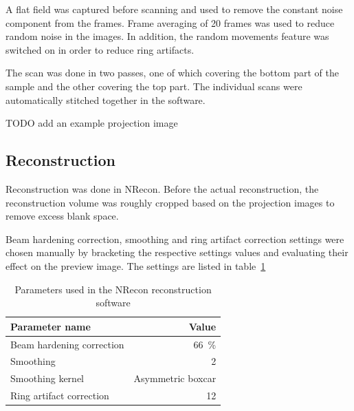 \documentclass[a4paper,twoside,12pt]{article}
\begin{document}
A flat field was captured before scanning and used to remove the constant noise component from the frames. Frame averaging of 20 frames was used to reduce random noise in the images. In addition, the random movements feature was switched on in order to reduce ring artifacts.

The scan was done in two passes, one of which covering the bottom part of the sample and the other covering the top part. The individual scans were automatically stitched together in the software.

TODO add an example projection image

\subsection{Reconstruction}
Reconstruction was done in NRecon. Before the actual reconstruction, the reconstruction volume was roughly cropped based on the projection images to remove excess blank space.

Beam hardening correction, smoothing and ring artifact correction settings were chosen manually by bracketing the respective settings values and evaluating their effect on the preview image. The settings are listed in table~\ref{table:nrecon_settings}
\begin{table}
    \centering
    \caption{Parameters used in the NRecon reconstruction software}
    \label{table:nrecon_settings}
    \begin{tabular}{lr}
        \toprule
        Parameter name & Value \\
        \midrule
        Beam hardening correction & \SI{66}{\percent} \\
        Smoothing & 2 \\
        Smoothing kernel & Asymmetric boxcar \\
        Ring artifact correction & 12 \\
        \bottomrule
    \end{tabular}
\end{table}
\end{document}
